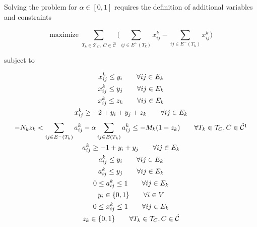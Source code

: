 \clearpage

Solving the problem for $\alpha \in [0, 1]$ requires the definition of
additional variables and constraints

\begin{equation}
	\label{eq:ecp-exact2}
	\text{maximize} \; \sum_{ T_{k} \in \mathcal{T}_{C}, \; C \in
		\mathcal{\hat{C}} } \big( \sum^{}_{ij \in E^{+} (T_{k})} x_{ij}
		^{k} - \sum_{ij \in E^{-} (T_{k})} x_{ij} ^{k} \big)
\end{equation} \begin{center} subject to \end{center}
\begin{gather}
	\label{eq:ecp-v12}
	x _{ij}^{k}  \leq y_i \quad\quad \forall ij \in E_k  \\
	\label{eq:ecp-v22}
	x _{ij}^{k}  \leq y_j \quad\quad \forall ij \in E_k \\
	\label{eq:ecp-t2}
	x _{ij}^{k}  \leq z_k \quad\quad \forall ij \in E_k \\
	\label{eq:ecp-e2}
	x _{ij} ^{k} \geq - 2 + y_i + y_j + z_k \quad\quad \forall ij \in E_k \\
	\label{eq:ecp-a-alpha-constraint}
	-N_k z_k < \sum^{}_{ij \in E^{-} (T_k)} a_{ij}^{k}  - \alpha \sum^{}_{ij
		\in E(T_k)}
	a_{ij} ^{k} \leq - M_{k} (1 - z_{k})  \quad\quad \forall T_{k} \in
	\mathcal{T} _{C}, C \in \mathcal{\hat{C}} \footnotemark\\
	\label{eq:ecp-a-ij-g-i-j2}
	a_{ij}^{k} \geq -1 + y_i + y_j \quad\quad \forall ij \in E_k \\
	\label{eq:ecp-a-ij-l-i2}
	a_{ij}^{k} \leq y_i\quad\quad \forall ij \in E_k \\
	\label{eq:ecp-a-ij-l-j2}
	a_{ij}^{k} \leq y_j \quad\quad \forall ij \in E_k \\
	\label{eq:ecp-a-domain-2}
	0 \leq a_{ij}^{k} \leq 1 \quad\quad \forall ij \in E_k \\
	\label{eq:ecp-vertex-def2}
	y _{i} \in  \{0, 1\} \quad\quad \forall i \in V \\
	\label{eq:ecp-edge-def2}
	0 \leq x _{ij} ^{k}  \leq 1 \quad\quad \forall ij \in E_k \\
	\label{eq:ecp-z-domain-2}
	z _{k} \in  \{0, 1\} \quad\quad \forall T_{k} \in \mathcal{T} _{C}, C \in
	\hat{\mathcal{C}}
\end{gather}



